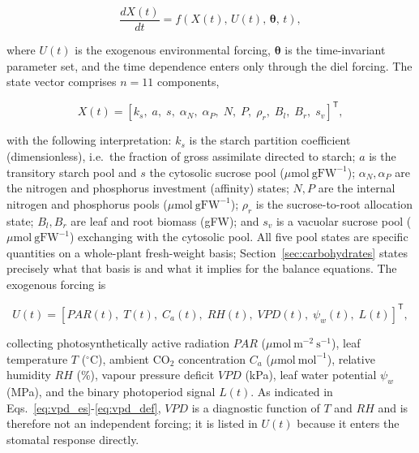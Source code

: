 \documentclass[a4paper,fleqn]{cas-sc}
\begin{document}
\begin{equation}
\frac{dX(t)}{dt} = f\!\left(X(t),\,U(t),\,\boldsymbol{\theta},\,t\right),
\label{eq:ode_general}
\end{equation}

where $U(t)$ is the exogenous environmental forcing, $\boldsymbol{\theta}$
is the time-invariant parameter set, and the time dependence
enters only through the diel forcing. The state vector comprises $n=11$
components,

\begin{equation}
X(t) =
\left[
k_s,\;
a,\;
s,\;
\alpha_N,\;
\alpha_P,\;
N,\;
P,\;
\rho_r,\;
B_l,\;
B_r,\;
s_v
\right]^{\mathsf{T}},
\label{eq:state_vector}
\end{equation}

with the following interpretation: $k_s$ is the starch partition
coefficient (dimensionless), i.e.\ the fraction of gross assimilate
directed to starch; $a$ is the transitory starch pool and $s$ the
cytosolic sucrose pool ($\mu\mathrm{mol\ gFW^{-1}}$); $\alpha_N,\alpha_P$
are the nitrogen and phosphorus investment (affinity) states; $N,P$ are the
internal nitrogen and phosphorus pools ($\mu\mathrm{mol\ gFW^{-1}}$);
$\rho_r$ is the
sucrose-to-root allocation state; $B_l,B_r$ are leaf and root biomass (gFW);
and $s_v$ is a vacuolar sucrose pool ($\mu\mathrm{mol\ gFW^{-1}}$) exchanging
with the cytosolic pool. All five pool states are specific quantities on a
whole-plant fresh-weight basis; Section~\ref{sec:carbohydrates} states
precisely what that basis is and what it implies for the balance equations.
The exogenous forcing is

\begin{equation}
U(t) =
\left[
\mathit{PAR}(t),\;
T(t),\;
C_a(t),\;
\mathit{RH}(t),\;
\mathit{VPD}(t),\;
\psi_w(t),\;
L(t)
\right]^{\mathsf{T}},
\label{eq:input_vector}
\end{equation}

collecting photosynthetically active radiation $\mathit{PAR}$
($\mu\mathrm{mol\ m^{-2}\ s^{-1}}$), leaf temperature $T$
($^\circ\mathrm{C}$), ambient CO$_2$ concentration $C_a$
($\mu\mathrm{mol\ mol^{-1}}$), relative humidity $\mathit{RH}$ (\%), vapour
pressure deficit $\mathit{VPD}$ (kPa), leaf water potential $\psi_w$
(MPa), and the binary photoperiod signal $L(t)$. As indicated in
Eqs.~\eqref{eq:vpd_es}-\eqref{eq:vpd_def}, $\mathit{VPD}$ is a diagnostic
function of $T$ and $\mathit{RH}$ and is therefore not an independent
forcing; it is listed in $U(t)$ because it enters the stomatal response
directly.
\end{document}
